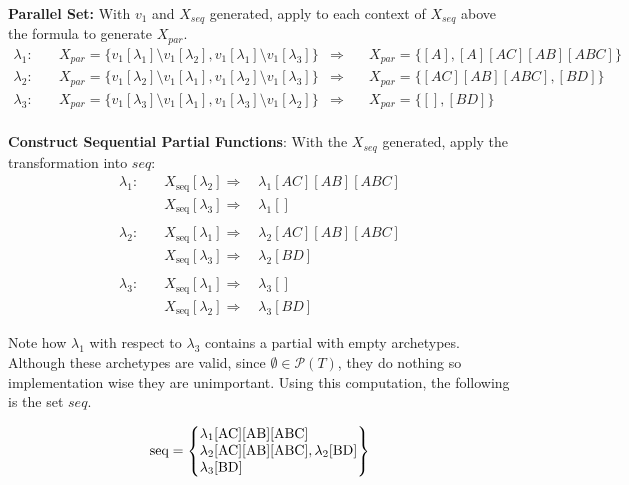 \textbf{Parallel Set:} With $v_1$ and $X_{seq}$ generated, apply to each context of $X_{seq}$ above the formula to generate $X_{par}$.
\begin{align*}
    \lambda_1: \quad & X_{par} = \{v_1[\lambda_1] \setminus v_1[\lambda_2], v_1[\lambda_1] \setminus v_1[\lambda_3]\} & \Rightarrow & \quad X_{par} = \{[A],[A][AC][AB][ABC]\} \\ 
    \lambda_2: \quad & X_{par} = \{v_1[\lambda_2] \setminus v_1[\lambda_1], v_1[\lambda_2] \setminus v_1[\lambda_3]\} & \Rightarrow & \quad X_{par} = \{[AC][AB][ABC],[BD]\} \\ 
    \lambda_3: \quad & X_{par} = \{v_1[\lambda_3] \setminus v_1[\lambda_1], v_1[\lambda_3] \setminus v_1[\lambda_2]\} & \Rightarrow & \quad X_{par} = \{[],[BD]\} \\ 
\end{align*}

\textbf{Construct Sequential Partial Functions}: With the $X_{seq}$ generated, apply the transformation into $seq$:
\begin{align*}
    \lambda_1: \quad & X_{\text{seq}}[\lambda_2]  \Rightarrow \quad \lambda_1[AC][AB][ABC] \\
                     & X_{\text{seq}}[\lambda_3]  \Rightarrow \quad \lambda_1[] \\ 
    \\[0.3em]
    \lambda_2: \quad & X_{\text{seq}}[\lambda_1]  \Rightarrow \quad \lambda_2[AC][AB][ABC] \\
                     & X_{\text{seq}}[\lambda_3]  \Rightarrow \quad \lambda_2[BD] \\
    \\[0.3em]
    \lambda_3: \quad & X_{\text{seq}}[\lambda_1]  \Rightarrow \quad \lambda_3[] \\
                     & X_{\text{seq}}[\lambda_2]  \Rightarrow \quad \lambda_3[BD]
\end{align*}

Note how $\lambda_1$ with respect to $\lambda_3$ contains a partial with empty archetypes. Although these archetypes are valid, since $\emptyset \in \mathcal{P}(T)$, they do nothing so implementation wise they are unimportant. Using this computation, the following is the set $seq$.

$$
\text{seq} = \left\{
\begin{array}{@{}l@{}}
    \lambda_1[\text{AC}][\text{AB}][\text{ABC}] \\ 
    \lambda_2[\text{AC}][\text{AB}][\text{ABC}], \lambda_2[\text{BD}] \\
    \lambda_3[\text{BD}]
\end{array}
\right\}
$$

